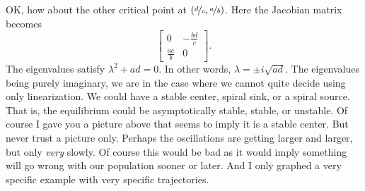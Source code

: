 OK, how about the other critical point at $(\nicefrac{d}{c},\nicefrac{a}{b})$.  Here
the Jacobian matrix becomes
\begin{equation*}
\begin{bmatrix}
0 & -\frac{bd}{c} \\
\frac{ac}{b} & 0
\end{bmatrix} .
\end{equation*}
The eigenvalues satisfy $\lambda^2 + ad = 0$.  In
other words, $\lambda = \pm i \sqrt{ad}$.  The eigenvalues being
purely imaginary, we are in the case where we cannot quite decide using only
linearization.  We could
have a stable center, spiral sink, or a spiral source.  That is, the
equilibrium could be asymptotically stable, stable, or unstable.  Of
course I gave you a picture above that seems to imply it is a stable
center.  But never trust a picture only.  Perhaps the oscillations
are getting larger and larger, but only \emph{very} slowly.  Of course this would be
bad as it would imply something will go wrong with our population
sooner or later.  And I only graphed a very specific example with very
specific trajectories.

